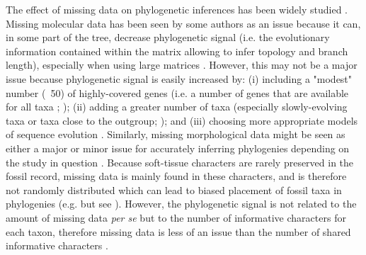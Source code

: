 \documentclass[12pt,letterpaper]{article}
\begin{document}
The effect of missing data on phylogenetic inferences has been widely studied \citep{wiensmissing2003,wiensmissing2006,wiensmissing2008,lemmonthe2009,rouresite-specific2011,sansomfossilization2013,pattinsonphylogeny2014,sansombias2014}. Missing molecular data has been seen by some authors as an issue because it can, in some part of the tree, decrease phylogenetic signal (i.e. the evolutionary information contained within the matrix allowing to infer topology and branch length), especially when using large matrices \citep{lemmonthe2009}. However, this may not be a major issue because phylogenetic signal is easily increased by: (i) including a "modest" number (~50) of highly-covered genes (i.e. a number of genes that are available for all taxa ; \citealt{rouresite-specific2011}); (ii) adding a greater number of taxa (especially slowly-evolving taxa or taxa close to the outgroup; \citealt{rouresite-specific2011}); and (iii) choosing more appropriate models of sequence evolution \citep{wiensmissing2006,wiensmissing2008,rouresite-specific2011}. Similarly, missing morphological data might be seen as either a major or minor issue for accurately inferring phylogenies depending on the study in question \citep{wiensmissing2003,sansomfossilization2013,pattinsonphylogeny2014}. Because soft-tissue characters are rarely preserved in the fossil record, missing data is mainly found in these characters, and is therefore not randomly distributed which can lead to biased placement of fossil taxa in phylogenies (e.g. \citealt{sansomfossilization2013} but see \citealt{pattinsonphylogeny2014}). However, the phylogenetic signal is not related to the amount of missing data \textit{per se} but to the number of informative characters for each taxon, therefore missing data is less of an issue than the number of shared informative characters \citep{kearneyfragmentary2002,wiensmissing2003,pattinsonphylogeny2014}.
\end{document}
